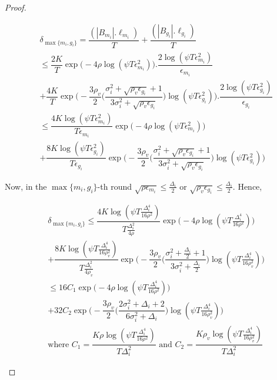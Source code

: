\begin{proof}
\begin{small}
\begin{align*}
&\delta_{\max\lbrace m_{i}, g_{i}\rbrace}=\dfrac{(|B_{m_{i}}|.\ell_{m_{i}})}{T} + \dfrac{(|B_{g_{i}}|.\ell_{g_{i}})}{T}\\
&\leq \dfrac{2K}{T}\exp\bigg(-4\rho\log (\psi T\epsilon_{m_{i}}^{2})\bigg).\dfrac{2\log (\psi T \epsilon_{m_{i}}^{2})}{\epsilon_{m_{i}}}\\ & + \dfrac{4K}{T}\exp\bigg(- \dfrac{3\rho_v}{2} \bigg(\dfrac{\sigma_{i}^{2}+\sqrt{\rho_{v}\epsilon_{g_{i}}}+1}{3\sigma_{i}^{2}+\sqrt{\rho_v \epsilon_{g_{i}}}}\bigg) \log(\psi T\epsilon_{g_{i}}^{2})\bigg).\dfrac{2\log (\psi T \epsilon_{g_{i}}^{2})}{\epsilon_{g_{i}}} \\
& \leq \dfrac{4K\log (\psi T \epsilon_{m_{i}}^{2})}{T\epsilon_{m_{i}}}\exp\bigg(-4\rho\log (\psi T\epsilon_{m_{i}}^{2})\bigg)\\
& + \dfrac{8K\log (\psi T \epsilon_{g_{i}}^{2})}{T\epsilon_{g_{i}}}\exp\bigg(- \dfrac{3\rho_v}{2} \bigg(\dfrac{\sigma_{i}^{2}+\sqrt{\rho_{v}\epsilon_{g_{i}}}+1}{3\sigma_{i}^{2}+\sqrt{\rho_v \epsilon_{g_{i}}}}\bigg) \log(\psi T\epsilon_{g_{i}}^{2}) \bigg)
\end{align*}
\end{small}

Now, in the $\max\lbrace m_{i}, g_{i}\rbrace$-th round $\sqrt{\rho\epsilon_{m_{i}}}\leq \frac{\Delta_{i}}{2}$ or $\sqrt{\rho_v\epsilon_{g_{i}}}\leq \frac{\Delta_{i}}{2}$. Hence,

\begin{small}
\begin{align*}
&\delta_{\max\lbrace m_{i},g_{i}\rbrace} \leq \dfrac{4K\log (\psi T \frac{\Delta_{i}^{4}}{16\rho^{2}})}{T\frac{\Delta_{i}^{2}}{4\rho}}\exp\bigg(-4\rho\log (\psi T\frac{\Delta_{i}^{4}}{16\rho^{2}})\bigg)\\
& + \dfrac{8K\log (\psi T \frac{\Delta_{i}^{4}}{16\rho_{v}^{2}})}{T\frac{\Delta_{i}^{2}}{4\rho_{v}}}\exp\bigg(- \dfrac{3\rho_v}{2} \bigg(\dfrac{\sigma_{i}^{2}+\frac{\Delta_{i}}{2}+1}{3\sigma_{i}^{2}+\frac{\Delta_{i}}{2}}\bigg) \log(\psi T\frac{\Delta_{i}^{4}}{16\rho_{v}^{2}}) \bigg)\\
&\leq 16 C_1\exp\bigg(-4\rho\log (\psi T\frac{\Delta_{i}^{4}}{16\rho^{2}})\bigg)\\
& + 32C_2\exp\bigg(- \dfrac{3\rho_v}{2} \bigg(\dfrac{2\sigma_{i}^{2}+\Delta_{i}+2}{6\sigma_{i}^{2}+\Delta_{i}}\bigg) \log(\psi T\frac{\Delta_{i}^{4}}{16\rho_{v}^{2}}) \bigg)\\
&\text{where $C_1=\dfrac{K\rho\log (\psi T \frac{\Delta_{i}^{4}}{16\rho^{2}})}{T\Delta_{i}^{2}}$ and $C_2= \dfrac{K\rho_v\log (\psi T \frac{\Delta_{i}^{4}}{16\rho_{v}^{2}})}{T\Delta_{i}^{2}}$}
\end{align*}
\end{small}


\end{proof}
